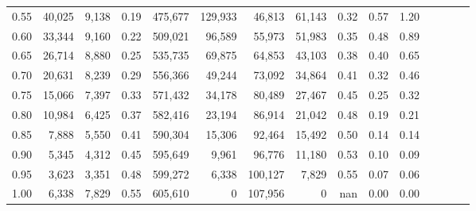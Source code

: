 \begin{tabular}{rrrcrrrrrrrrrrr}
0.55 &  40,025 &  9,138 &                                       0.19 &  475,677 &  129,933 &   46,813 &   61,143 &  0.32 &  0.57 &                         1.20 \\
0.60 &  33,344 &  9,160 &                                       0.22 &  509,021 &   96,589 &   55,973 &   51,983 &  0.35 &  0.48 &                         0.89 \\
0.65 &  26,714 &  8,880 &                                       0.25 &  535,735 &   69,875 &   64,853 &   43,103 &  0.38 &  0.40 &                         0.65 \\
0.70 &  20,631 &  8,239 &                                       0.29 &  556,366 &   49,244 &   73,092 &   34,864 &  0.41 &  0.32 &                         0.46 \\
0.75 &  15,066 &  7,397 &                                       0.33 &  571,432 &   34,178 &   80,489 &   27,467 &  0.45 &  0.25 &                         0.32 \\
0.80 &  10,984 &  6,425 &                                       0.37 &  582,416 &   23,194 &   86,914 &   21,042 &  0.48 &  0.19 &                         0.21 \\
0.85 &   7,888 &  5,550 &                                       0.41 &  590,304 &   15,306 &   92,464 &   15,492 &  0.50 &  0.14 &                         0.14 \\
0.90 &   5,345 &  4,312 &                                       0.45 &  595,649 &    9,961 &   96,776 &   11,180 &  0.53 &  0.10 &                         0.09 \\
0.95 &   3,623 &  3,351 &                                       0.48 &  599,272 &    6,338 &  100,127 &    7,829 &  0.55 &  0.07 &                         0.06 \\
1.00 &   6,338 &  7,829 &                                       0.55 &  605,610 &        0 &  107,956 &        0 &   nan &  0.00 &                         0.00 \\
\bottomrule
\end{tabular}
